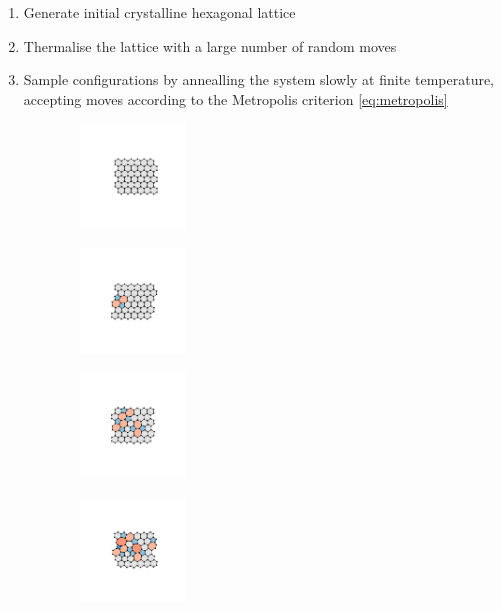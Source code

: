 \begin{enumerate}
	\item Generate initial crystalline hexagonal lattice
	\item Thermalise the lattice with a large number of random moves 
	\item Sample configurations by annealling the system slowly at finite temperature, accepting moves according to the Metropolis criterion \ref{eq:metropolis}
\end{enumerate}
\begin{figure}[bt]
     \centering
     
     \begin{subfigure}[b]{0.24\textwidth}
    \centering
         \includegraphics[height=2.8cm]{./figures/methods/bs_0.pdf}
         \caption{}
         \label{fig:bsmc1}
     \end{subfigure}
     \hfill
     \begin{subfigure}[b]{0.24\textwidth}
    \centering
         \includegraphics[height=2.8cm]{./figures/methods/bs_1.pdf}
         \caption{}
         \label{fig:bsmc2}
     \end{subfigure}
     \hfill
     \begin{subfigure}[b]{0.24\textwidth}
    \centering
         \includegraphics[height=2.8cm]{./figures/methods/bs_3.pdf}
         \caption{}
         \label{fig:bsmc3}
     \end{subfigure}
     \hfill
     \begin{subfigure}[b]{0.24\textwidth}
    \centering
         \includegraphics[height=2.8cm]{./figures/methods/bs_5.pdf}
         \caption{}
         \label{fig:bsmc4}
     \end{subfigure}
     

\end{figure}
